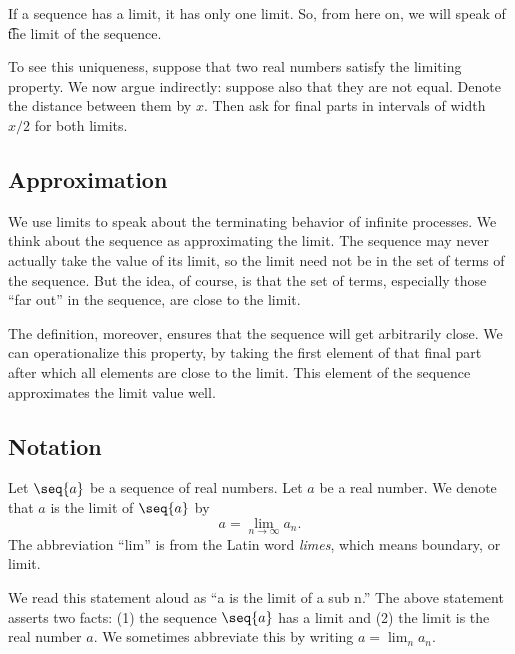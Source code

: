 If a sequence has a limit, it has only one limit.
So, from here on, we will speak of \t{the limit} of the sequence.

To see this uniqueness, suppose that two real numbers satisfy the limiting property.
We now argue indirectly: suppose also that they are not equal.
Denote the distance between them by $x$.
Then ask for final parts in intervals of width $x/2$ for both limits.

\subsection*{Approximation}

We use limits to speak about the terminating behavior of infinite processes.
We think about the sequence as approximating the limit.
The sequence may never actually take the value of its limit, so the limit need not be in the set of terms of the sequence.
But the idea, of course, is that the set of terms, especially those ``far out'' in the sequence, are close to the limit.

The definition, moreover, ensures that the sequence will get arbitrarily close.
We can operationalize this property, by taking the first element of that final part after which all elements are close to the limit.
This element of the sequence approximates the limit value well.

\subsection*{Notation}

Let $\seq{a}$ be a sequence of real numbers.
Let $a$ be a real number.
We denote that $a$ is the limit of $\seq{a}$ by
\[
a = \lim_{n \to \infty} a_n.
\]
The abbreviation ``lim'' is from the Latin word \textit{limes}, which means boundary, or limit.

We read this statement aloud as ``a is the limit of a sub n.''
The above statement asserts two facts: (1) the sequence $\seq{a}$ has a limit and (2) the limit is the real number $a$.
We sometimes abbreviate this by writing
$a = \lim_{n} a_n$.

